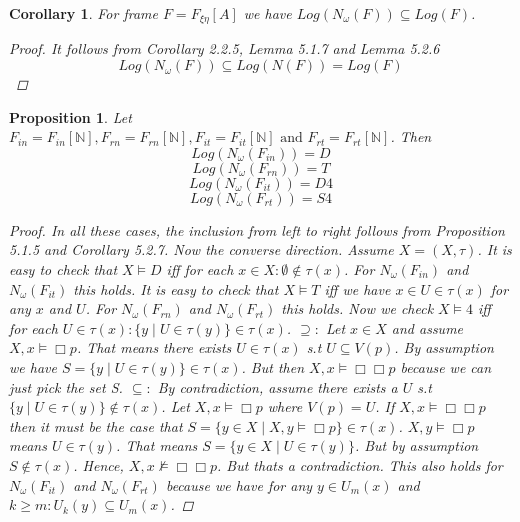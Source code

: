 \documentclass[12pt, a4paper]{scrartcl}
\newtheorem{proposition}[definition]{Proposition}
\newtheorem{corollary}[definition]{Corollary}
\begin{document}
\begin{corollary}
    For frame $F = F_{\xi \eta}[A]$ we have $Log(N_\omega(F)) \subseteq Log(F)$.
    \begin{proof}
        It follows from Corollary 2.2.5, Lemma 5.1.7 and Lemma 5.2.6 
        $$Log(N_\omega(F)) \subseteq Log(N(F)) = Log(F)$$
    \end{proof}

\end{corollary}

\begin{proposition}
    Let $F_{in} = F_{in}[\mathbb{N}], F_{rn} = F_{rn}[\mathbb{N}], F_{it} = F_{it}[\mathbb{N}] \mbox{ and } F_{rt} = F_{rt}[\mathbb{N}]$. Then
    $$Log(N_\omega(F_{in})) = D$$
    $$Log(N_\omega(F_{rn})) = T$$
    $$Log(N_\omega(F_{it})) = D4$$
    $$Log(N_\omega(F_{rt})) = S4$$

    \begin{proof}
        In all these cases, the inclusion from left to right follows from Proposition 5.1.5 and Corollary 5.2.7.
        Now the converse direction. Assume $X =(X,\tau)$. \newline
        It is easy to check that $X \vDash D$ iff for each $x \in X : \emptyset \notin \tau(x)$. For $N_\omega(F_{in})$ and $N_\omega(F_{it})$ this holds. \newline
        It is easy to check that $X \vDash T$ iff we have $x\in U \in \tau(x)$ for any $x$ and $U$. For $N_\omega(F_{rn})$ and $N_\omega(F_{rt})$ this holds. \newline
        Now we check $X \vDash 4$ iff for each $U \in \tau(x) : \{y \mid U \in \tau(y)\} \in \tau(x)$. \newline
        $\supseteq : $ Let $x \in X$ and assume $X,x \vDash \Box p$. That means there exists $U \in \tau(x)$ s.t $U\subseteq V(p)$.
        By assumption we have $S = \{y \mid U \in \tau(y)\} \in \tau(x)$. But then $X,x \vDash \Box\Box p$ because we can just pick the set S. \newline
        $\subseteq :$ By contradiction, assume there exists a $U$ s.t $\{y \mid U \in \tau(y)\} \notin \tau(x)$. Let $X,x \vDash \Box p$ where $V(p) = U$.
        If $X,x \vDash \Box\Box p$ then it must be the case that  \newline 
        $S =\{y \in X \mid X,y \vDash \Box p\} \in \tau(x)$. $X,y \vDash \Box p$ means $U \in \tau(y)$. That means $S = \{y \in X \mid U \in \tau(y)\}$. But by assumption $S \notin \tau(x)$. 
        Hence, $X,x \not\vDash \Box\Box p$. But thats a contradiction. This also holds for $N_\omega(F_{it})$ and $N_\omega(F_{rt})$ because we have for any $y \in U_m(x)$ and 
        $k \geq m : U_k(y) \subseteq U_m(x)$.
            
    \end{proof}
\end{proposition}
\end{document}
